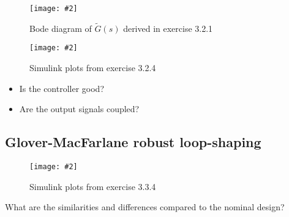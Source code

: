 \documentclass[11pt,a4paper]{article}
\newcommand{\image}[3]{
	\begin{figure}[!ht]
		\centering
	    \texttt{[image: \#2]}
		\caption{#3}
		\label{fig:#2}
	\end{figure}
}
\begin{document}
	\image{0.5}{figure_4.pdf}{Bode diagram of $\tilde{G}(s)$ derived in exercise 3.2.1}
	\image{0.5}{figure_5.pdf}{Simulink plots from exercise 3.2.4}

	\begin{itemize}
		\item Is the controller good?
		\item Are the output signals coupled?
	\end{itemize}

\subsection*{Glover-MacFarlane robust loop-shaping}
	\image{0.5}{figure_6.pdf}{Simulink plots from exercise 3.3.4}

\par What are the similarities and differences compared to the nominal design?
	\par\dotfill\par\dotfill
\end{document}
